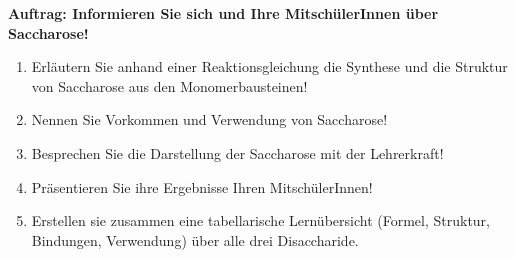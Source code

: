 \documentclass{scrartcl}  %
\begin{document}
\vspace{0.3cm}
			\noindent \textbf{Auftrag: Informieren Sie sich und Ihre MitschülerInnen über Saccharose!}
			\begin{enumerate}
			     \item Erläutern Sie anhand einer Reaktionsgleichung die Synthese und die Struktur von Saccharose aus den Monomerbausteinen!
			     \item Nennen Sie Vorkommen und Verwendung von Saccharose!
			     \item Besprechen Sie die Darstellung der Saccharose mit der Lehrerkraft!
			     \item Präsentieren Sie ihre Ergebnisse Ihren MitschülerInnen!
			     \item Erstellen sie zusammen eine tabellarische Lernübersicht (Formel, Struktur, Bindungen, Verwendung) über alle drei Disaccharide.
			\end{enumerate}
\end{document}
